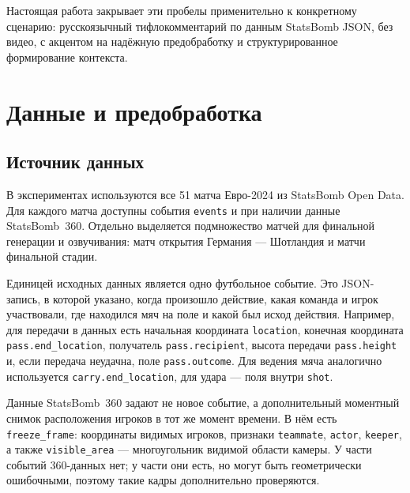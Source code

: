 \documentclass[a4paper,14pt]{extarticle}
\numberwithin{table}{section}
\numberwithin{figure}{section}
\numberwithin{equation}{section}
\begin{document}
Настоящая работа закрывает эти пробелы применительно к конкретному сценарию: русскоязычный тифлокомментарий по данным StatsBomb JSON, без видео, с акцентом на надёжную предобработку и структурированное формирование контекста.

\section{Данные и предобработка}\label{sec:data}

\subsection{Источник данных}

В экспериментах используются все 51 матча Евро-2024 из StatsBomb Open Data. Для каждого матча доступны события \texttt{events} и при наличии данные StatsBomb~360. Отдельно выделяется подмножество матчей для финальной генерации и озвучивания: матч открытия Германия --- Шотландия и матчи финальной стадии.

Единицей исходных данных является одно футбольное событие. Это JSON-запись, в которой указано, когда произошло действие, какая команда и игрок участвовали, где находился мяч на поле и какой был исход действия. Например, для передачи в данных есть начальная координата \texttt{location}, конечная координата \texttt{pass.end\_location}, получатель \texttt{pass.recipient}, высота передачи \texttt{pass.height} и, если передача неудачна, поле \texttt{pass.outcome}. Для ведения мяча аналогично используется \texttt{carry.end\_location}, для удара --- поля внутри \texttt{shot}.

Данные StatsBomb~360 задают не новое событие, а дополнительный моментный снимок расположения игроков в тот же момент времени. В нём есть \texttt{freeze\_frame}: координаты видимых игроков, признаки \texttt{teammate}, \texttt{actor}, \texttt{keeper}, а также \texttt{visible\_area} --- многоугольник видимой области камеры. У части событий 360-данных нет; у части они есть, но могут быть геометрически ошибочными, поэтому такие кадры дополнительно проверяются.
\end{document}
